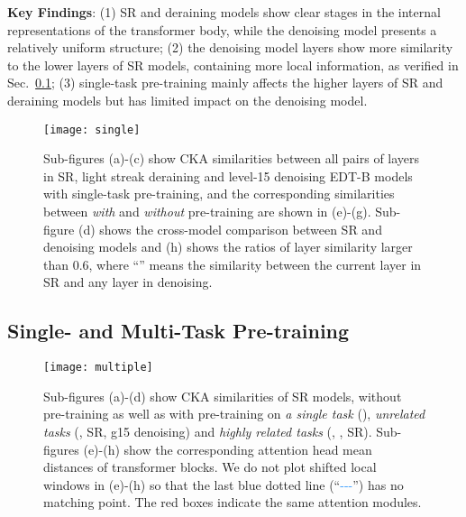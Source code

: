 \documentclass[runningheads]{llncs}
\begin{document}
	\vspace{0.05in}
	\noindent\textbf{Key Findings}: (1) SR and deraining models show clear stages in the internal representations of the transformer body, while the denoising model presents a relatively uniform structure; (2) the denoising model layers show more similarity to the lower layers of SR models, containing more local information, as verified in Sec.~\ref{sec:multi_task}; (3) single-task pre-training mainly affects the higher layers of SR and deraining models but has limited impact on the denoising model. 
	
	\begin{figure}[t]
		\begin{center}
			\texttt{[image: single]}
		\end{center}
		\vspace{-0.2in}
		\caption{Sub-figures (a)-(c) show CKA similarities between all pairs of layers in  SR, light streak deraining and level-15 denoising EDT-B models with single-task pre-training, and the corresponding similarities between \textit{with} and \textit{without} pre-training are shown in (e)-(g). Sub-figure (d) shows the cross-model comparison between SR and denoising models and (h) shows the ratios of layer similarity larger than 0.6, where ``'' means the similarity between the current layer in SR and any layer in denoising.}
		\label{fig:single}
		\vspace{-0.1in}
	\end{figure}
	


	\subsection{Single- and Multi-Task Pre-training}
	\label{sec:multi_task}
	
	\begin{figure}[t]
		\begin{center}
			\texttt{[image: multiple]}
		\end{center}
		\vspace{-0.15in}
		\caption{Sub-figures (a)-(d) show CKA similarities of  SR models, without pre-training as well as with pre-training on \textit{a single task} (), \textit{unrelated tasks} (,  SR, g15 denoising) and \textit{highly related tasks} (, ,  SR). Sub-figures (e)-(h) show the corresponding attention head mean distances of transformer blocks. We do not plot shifted local windows in (e)-(h) so that the last blue dotted line (``\textcolor{dodgerblue}{-{}-{}-}'') has no matching point. The red boxes indicate the same attention modules.}
		\label{fig:multiple}
		\vspace{-0.1in}
	\end{figure}
	
\end{document}
